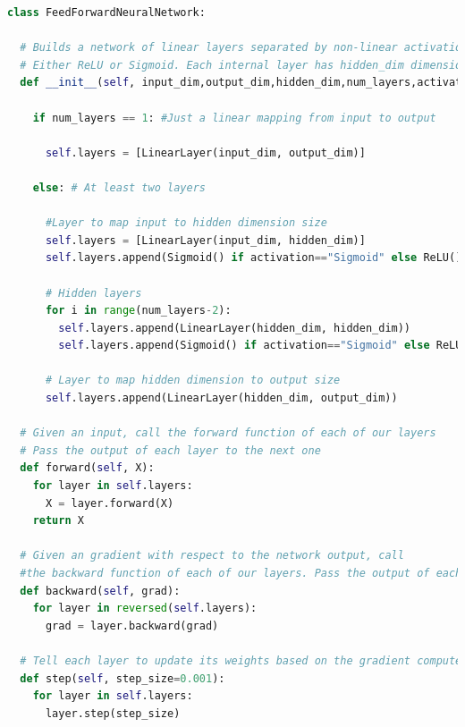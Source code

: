 \documentclass[a4paper,10pt]{article}
\begin{document}
\begin{center}
\begin{minipage}{0.9\textwidth}
\begin{lstlisting}[language=Python]
class FeedForwardNeuralNetwork:

  # Builds a network of linear layers separated by non-linear activations
  # Either ReLU or Sigmoid. Each internal layer has hidden_dim dimensions.
  def __init__(self, input_dim,output_dim,hidden_dim,num_layers,activation="ReLU"):
  
    if num_layers == 1: #Just a linear mapping from input to output
    
      self.layers = [LinearLayer(input_dim, output_dim)]
      
    else: # At least two layers
    
      #Layer to map input to hidden dimension size
      self.layers = [LinearLayer(input_dim, hidden_dim)]
      self.layers.append(Sigmoid() if activation=="Sigmoid" else ReLU())
      
      # Hidden layers
      for i in range(num_layers-2):
        self.layers.append(LinearLayer(hidden_dim, hidden_dim))
        self.layers.append(Sigmoid() if activation=="Sigmoid" else ReLU())
        
      # Layer to map hidden dimension to output size
      self.layers.append(LinearLayer(hidden_dim, output_dim))

  # Given an input, call the forward function of each of our layers
  # Pass the output of each layer to the next one
  def forward(self, X):
    for layer in self.layers:
      X = layer.forward(X)
    return X

  # Given an gradient with respect to the network output, call 
  #the backward function of each of our layers. Pass the output of each layer to the one before it
  def backward(self, grad):
    for layer in reversed(self.layers):
      grad = layer.backward(grad)

  # Tell each layer to update its weights based on the gradient computed in the backward pass
  def step(self, step_size=0.001):
    for layer in self.layers:
      layer.step(step_size)
      
\end{lstlisting}
\end{minipage}
\end{center}
\end{document}
